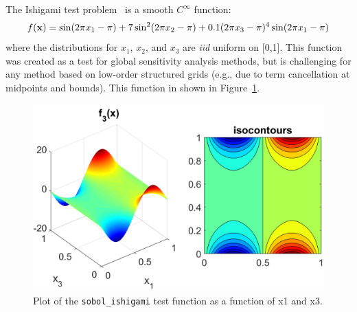 The Ishigami test problem~\cite{storlie_09} is a
smooth $C^{\infty}$ function:
\begin{equation}
f({\bf x}) = \sin(2 \pi x_1 - \pi) + 7 \sin^2(2 \pi x_2 - \pi) 
+ 0.1(2 \pi x_3 - \pi)^4 \sin(2 \pi x_1 - \pi)
\end{equation}
where the distributions for $x_1$, $x_2$, and $x_3$ are {\it iid}
uniform on [0,1].  This function was created as a test for global
sensitivity analysis methods, but is challenging for any method based
on low-order structured grids (e.g., due to term cancellation at
midpoints and bounds). 
This function in shown in Figure~\ref{fig:sobol_ishigami}.
\begin{figure}
  \centering
  \includegraphics[scale=0.7]{images/sobol_ishigami}
  \caption{Plot of the \texttt{sobol\_ishigami} test function as a function of x1 and x3.}
  \label{fig:sobol_ishigami}
\end{figure}

